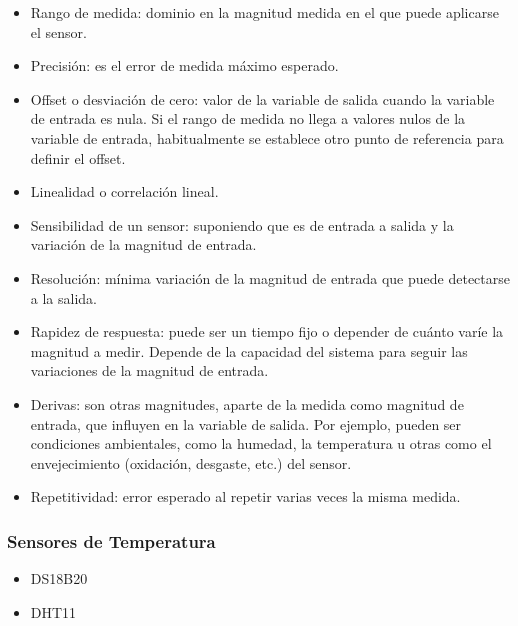 	\begin{itemize}
		\item Rango de medida: dominio en la magnitud medida en el que puede aplicarse el sensor.
		
		\item Precisión: es el error de medida máximo esperado.
		
		\item Offset o desviación de cero:  valor de la variable de salida cuando la variable de entrada es nula. Si el rango de medida no llega a valores nulos de la variable de entrada, habitualmente se establece otro punto de referencia para definir el offset.
		
		\item Linealidad o correlación lineal.
		
		\item Sensibilidad de un sensor: suponiendo que es de entrada a salida y la variación de la magnitud de entrada.
		
		\item Resolución: mínima variación de la magnitud de entrada que puede detectarse a la salida.
		
		\item Rapidez de respuesta: puede ser un tiempo fijo o depender de cuánto varíe la magnitud a medir. Depende de la capacidad del sistema para seguir las variaciones de la magnitud de entrada.
		
		\newpage
		\thispagestyle{plain}
		
		\item Derivas: son otras magnitudes, aparte de la medida como magnitud de entrada, que influyen en la variable de salida. Por ejemplo, pueden ser condiciones ambientales, como la humedad, la temperatura u otras como el envejecimiento (oxidación, desgaste, etc.) del sensor.
		
		\item Repetitividad: error esperado al repetir varias veces la misma medida.
	\end{itemize}

\subsubsection{Sensores de Temperatura}
	\begin{itemize}
		\item DS18B20
		\item DHT11
	\end{itemize}